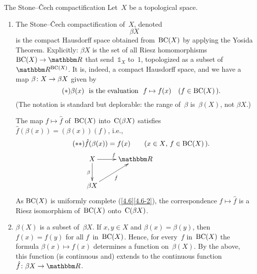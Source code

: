 \documentclass[main.tex]{subfiles}
\begin{document}
\begin{psec}{4.12}{The Stone--\v{C}ech compactification}
Let~$X$ be a topological space.
\begin{enumerate}[label=(\Roman*)]
\item \label{4.12-I}
The Stone--\v{C}ech compactification of~$X$,
denoted
\begin{equation*}
\beta X
\end{equation*}
is the compact Hausdorff space
obtained from~$\mathrm{BC}(X)$
by applying the Yosida Theorem.
Explicitly:
$\beta X$ is 
the set of all Riesz homomorphisms
$\BCont{X}\ra \R$ that send~$\mathbb{1}_X$ to~$1$,
topologized as a subset of~$\R^{\BCont{X}}$.
It is,
indeed,
a compact Hausdorff space,
and we have a map
$\beta\colon X \rightarrow \beta X$ given by
\begin{equation*}
\tag{$*$} \label{eq4.12*}
\beta(x)\ \htam{ is the evaluation }\ 
f\mapsto f(x) 
\quad(f\in \BCont{X}\,)\htam{.}
\end{equation*}
(The notation is standard but deplorable:
the range of~$\beta$ is~$\beta(X)$, not $\beta X$.)

The map $f\mapsto \hat{f}$ of~$\mathrm{BC}(X)$ into~$\mathrm{C}(\beta X)$
satisfies $\hat{f}(\beta(x))=(\beta(x))(f)$, i.e.,
\begin{alignat*}{2}
\tag{$**$} \label{eq4.12**}
&\hat{f}(\beta(x)) = f(x) \qquad (x\in X\htam{,}\ f\in\BCont{X}\,)\htam{.}\\
&\xymatrix{
X\ar[r]^f \ar[d]_\beta & \R \\
\beta X \ar[ru]_{\hat f}}
\end{alignat*}
As $\mathrm{BC}(X)$ is uniformly complete (\ref{4.6}\ref{4.6-2}),
the correspondence $f\mapsto \hat{f}$
is a Riesz isomorphism of~$\mathrm{BC}(X)$ onto~$\mathrm{C}(\beta X)$.
%
\item \label{4.12-II}
$\beta(X)$ is a subset of~$\beta X$.
If $x,y\in X$ and $\beta(x)=\beta(y)$,
then $f(x)=f(y)$ for all $f$~in~$\mathrm{BC}(X)$.
Hence,
for every~$f$ in~$\mathrm{BC}(X)$
the formula $\beta(x)\mapsto f(x)$ 
determines a function on~$\beta(X)$.
By the above,
this function (is continuous and)
extends to the continuous 
function $\hat{f}\colon \beta X \ra \R$.


\end{enumerate}
\end{psec}
\end{document}
